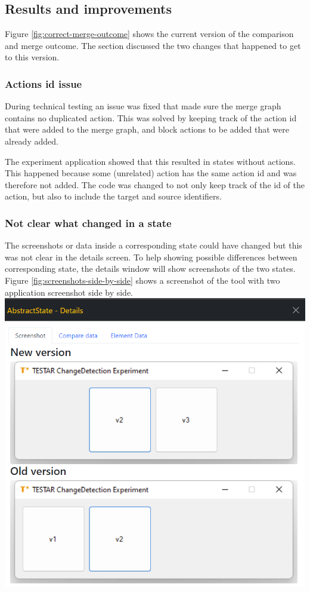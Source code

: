\subsection{Results and improvements}
Figure \ref{fig:correct-merge-outcome} shows the current version of the comparison and merge outcome. The section discussed the two changes that happened to get to this version.

\subsubsection{Actions id issue}
During technical testing an issue was fixed that made sure the merge graph contains no duplicated action. This was solved by keeping track of the action id that were added to the merge graph, and block actions to be added that were already added.

The experiment application showed that this resulted in states without actions. This happened because some (unrelated) action has the same action id and was therefore not added. The code was changed to not only keep track of the id of the action, but also to include the target and source identifiers.  

\subsubsection{Not clear what changed in a state}
The screenshots or data inside a corresponding state could have changed but this was not clear in the details screen. To help showing possible differences between corresponding state, the details window will show screenshots of the two states. Figure \ref{fig:screenshots-side-by-side} shows a screenshot of the tool with two application screenshot side by side.\\

\begingroup
\captionsetup{type=figure}
\includegraphics[scale=0.6]{images/6-Screenshot-Side-By-Side.png}
\label{fig:screenshots-side-by-side}
\endgroup